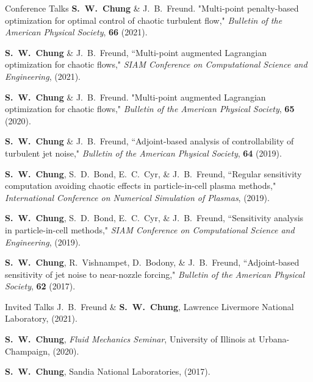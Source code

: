 \documentclass{resume} %
\begin{document}
\clearpage
\begin{rSection}{Conference Talks}
\textbf{S.\ W.\ Chung} \& J.\ B.\ Freund. "Multi-point penalty-based optimization for optimal control of chaotic turbulent flow,"
\textit{Bulletin of the American Physical Society}, \textbf{66} (2021).

\par
\textbf{S.\ W.\ Chung} \& J.\ B.\ Freund, ``Multi-point augmented Lagrangian optimization for chaotic flows,"
\textit{SIAM Conference on Computational Science and Engineering}, (2021).

\par
\textbf{S.\ W.\ Chung} \& J.\ B.\ Freund. "Multi-point augmented Lagrangian optimization for chaotic flows,"
\textit{Bulletin of the American Physical Society}, \textbf{65} (2020).

\par
\textbf{S.\ W.\ Chung} \& J.\ B.\ Freund,
``Adjoint­-based analysis of controllability of turbulent jet noise,"
\textit{Bulletin of the American Physical Society}, \textbf{64} (2019).

\par
\textbf{S.\ W.\ Chung}, S.\ D.\ Bond, E.\ C.\ Cyr, \& J.\ B.\ Freund,
``Regular sensitivity computation avoiding chaotic effects in particle-in-cell plasma methods,"
\textit{International Conference on Numerical Simulation of Plasmas}, (2019).

\par
\textbf{S.\ W.\ Chung}, S.\ D.\ Bond, E.\ C.\ Cyr, \& J.\ B.\ Freund, ``Sensitivity analysis in particle-in-cell methods,"
\textit{SIAM Conference on Computational Science and Engineering}, (2019).

\par
\textbf{S.\ W.\ Chung}, R.\ Vishnampet, D.\ Bodony, \& J.\ B.\ Freund, ``Adjoint-based sensitivity of jet noise to near-nozzle forcing,"
\textit{Bulletin of the American Physical Society}, \textbf{62} (2017).
\end{rSection}

\begin{rSection}{Invited Talks}
J.\ B.\ Freund \& \textbf{S.\ W.\ Chung}, Lawrence Livermore National Laboratory, (2021).
\par
\textbf{S.\ W.\ Chung}, \textit{Fluid Mechanics Seminar}, University of Illinois at Urbana-Champaign, (2020).
\par
\textbf{S.\ W.\ Chung}, Sandia National Laboratories, (2017).
\end{rSection}
\end{document}
